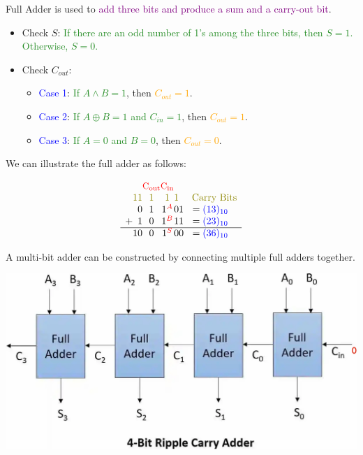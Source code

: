 \documentclass{book}
\begin{document}
Full Adder is used to \textcolor{purple}{add three bits and produce a sum and a carry-out bit}.
\begin{itemize}
    \item Check $S$: \textcolor{forestgreen}{If there are an odd number of 1's among the three bits, then $S = 1$. Otherwise, $S = 0$.}
    \item Check $C_{out}$:
    \begin{itemize}
        \item \textcolor{blue}{Case 1}: \textcolor{forestgreen}{If $A \land B = 1$}, then \textcolor{orange}{$C_{out} = 1$}.
        \item \textcolor{blue}{Case 2}: \textcolor{forestgreen}{If $A \oplus B = 1$ and $C_{in} = 1$}, then \textcolor{orange}{$C_{out} = 1$}.
        \item \textcolor{blue}{Case 3}: \textcolor{forestgreen}{If $A = 0$ and $B = 0$}, then \textcolor{orange}{$C_{out} = 0$}.
    \end{itemize}
\end{itemize}
We can illustrate the full adder as follows:
\begin{center}
    \[
        \begin{array}{c@{}c@{}c@{}c@{}c@{}c@{}c@{}c}
            & & & \textcolor{red}{\text{\small C}_{\text{out}}} & \textcolor{red}{\text{\small C}_{\text{in}}} & & & \\
            & \textcolor{olive}{1} & \textcolor{olive}{1} & \textcolor{olive}{1} & \textcolor{olive}{1} & \textcolor{olive}{1} & & \hspace{3mm} \textcolor{olive}{\text{Carry Bits}}\\
            &  & 0 & 1 & 1^{\textcolor{red}{A}} & 0 & 1 & = \textcolor{blue}{(13)_{10}}\\
            + &  & 1 & 0 & 1^{\textcolor{red}{B}} & 1 & 1 & = \textcolor{blue}{(23)_{10}}\\
            \hline
            & 1 & 0 & 0 & 1^{\textcolor{red}{S}} & 0 & 0 & = \textcolor{blue}{(36)_{10}}
        \end{array}
        \]
\end{center}
A multi-bit adder can be constructed by connecting multiple full adders together.\\
\begin{center}
    \includegraphics[scale = 0.18]{ch1/ch1_figure2.jpeg}
\end{center}
\end{document}
